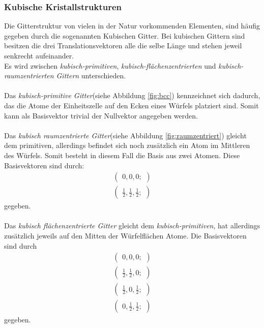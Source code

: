 \subsubsection{Kubische Kristallstrukturen}
\label{subsubsec:kubische_gitter}

Die Gitterstruktur von vielen in der Natur vorkommenden Elementen,
sind häufig gegeben durch die sogenannten Kubischen Gitter.
Bei kubischen Gittern sind besitzen die drei Translationsvektoren
alle die selbe Länge und stehen jeweil senkrecht aufeinander.\\
Es wird zwischen \textit{kubisch-primitiven},
\textit{kubisch-flächenzentrierten} und
\textit{kubisch-raumzentrierten Gittern} unterschieden. \\ \\
Das \textit{kubisch-primitive Gitter}(siehe Abbildung \ref{fig:bcc})
kennzeichnet sich dadurch,
das die Atome der Einheitszelle auf den Ecken
eines Würfels platziert sind. Somit kann als Basisvektor trivial
der Nullvektor angegeben werden.\\ \\
Das \textit{kubisch raumzentrierte Gitter}(siehe Abbildung \ref{fig:raumzentriert})
gleicht dem primitiven, allerdings befindet sich noch
zusätzlich ein Atom im Mittleren des Würfels.
Somit besteht in diesem Fall die Basis aus zwei Atomen.
Diese Basisvektoren sind durch:
\begin{align}
  \label{eqn:2*}
  \begin{pmatrix}
    0, 0, 0;
  \end{pmatrix}\\
  \begin{pmatrix}
    \frac{1}{2}, \frac{1}{2}, \frac{1}{2};
  \end{pmatrix}
\end{align}
gegeben.\\ \\
Das \textit{kubisch flächenzentrierte Gitter} gleicht dem
\textit{kubisch-primitiven}, hat
allerdings zusätzlich jeweils auf den Mitten der Würfelflächen Atome.
Die Basisvektoren sind durch
\begin{align}
   \label{eqn:3*}
   \begin{pmatrix}
     0, 0, 0;
   \end{pmatrix}\\
   \begin{pmatrix}
     \frac{1}{2}, \frac{1}{2}, 0;
   \end{pmatrix}\\
   \begin{pmatrix}
     \frac{1}{2}, 0, \frac{1}{2};
     \end{pmatrix}\\
     \begin{pmatrix}
       0, \frac{1}{2}, \frac{1}{2};
     \end{pmatrix}
\end{align}
gegeben.

